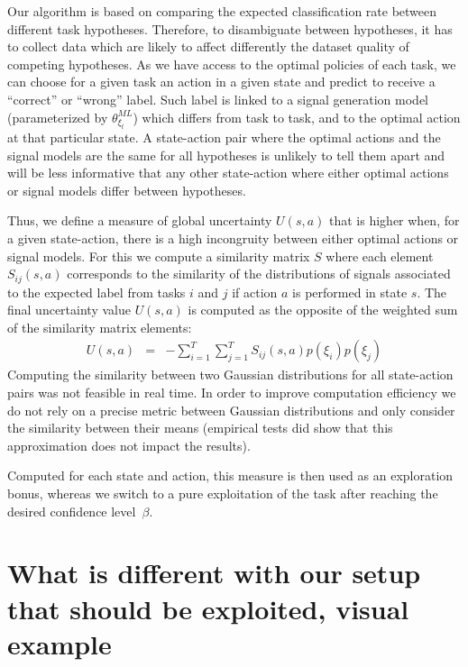 Our algorithm is based on comparing the expected classification rate between different task hypotheses. Therefore, to disambiguate between hypotheses, it has to collect data which are likely to affect differently the dataset quality of competing hypotheses. As we have access to the optimal policies of each task, we can choose for a given task an action in a given state and predict to receive a ``correct'' or ``wrong'' label. Such label is linked to a signal generation model (parameterized by $\theta^{ML}_{\xi_t}$) which differs from task to task, and to the optimal action at that particular state. A state-action pair where the optimal actions and the signal models are the same for all hypotheses is unlikely to tell them apart and will be less informative that any other state-action where either optimal actions or signal models differ between hypotheses.

Thus, we define a measure of global uncertainty $U(s,a)$ that is higher when, for a given state-action, there is a high incongruity between either optimal actions or signal models. For this we compute a similarity matrix $S$ where each element $S_{ij}(s,a)$ corresponds to the similarity of the distributions of signals associated to the expected label from tasks $i$ and $j$ if action $a$ is performed in state $s$. The final uncertainty value $U(s,a)$ is computed as the opposite of the weighted sum of the similarity matrix elements:
%
\begin{eqnarray}
U(s,a) &=& - \sum_{i = 1}^{T} \sum_{j = 1}^{T} S_{ij}(s,a) p(\xi_i)p(\xi_j)
\end{eqnarray}
%
Computing the similarity between two Gaussian distributions for all state-action pairs was not feasible in real time. In order to improve computation efficiency we do not rely on a precise metric between Gaussian distributions and only consider the similarity between their means (empirical tests did show that this approximation does not impact the results).

Computed for each state and action, this measure is then used as an exploration bonus, whereas we switch to a pure exploitation of the task after reaching the desired confidence level~$\beta$.

\section{What is different with our setup that should be exploited, visual example}

